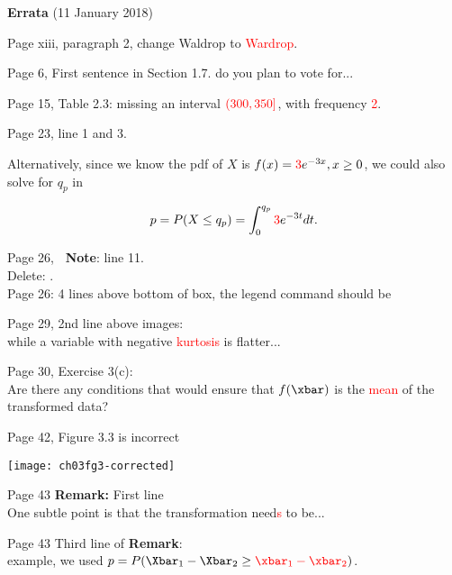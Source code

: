 \documentclass[11pt]{article}
\begin{document}
\medskip
{\bf \Large Errata} (11 January 2018)

\bigskip
Page xiii, paragraph 2, change Waldrop to \textcolor{red}{Wardrop}.

\bigskip
Page 6, First sentence in Section 1.7. {\color{red}{Whom}} do you plan to vote for...


\bigskip
Page 15, Table 2.3: missing an interval $\textcolor{red}{(300, 350]}$, with frequency
\textcolor{red}{2}.


\bigskip
Page 23, line 1 and 3.%

\smallskip
Alternatively, since we know the pdf of $X$ is $f(x)=\textcolor{red}{3}e^{-3x}, x\ge 0$, we
could also solve for $q_p$ in

\[
p = P(X \le q_p)=\int_0^{q_p}\textcolor{red}{3}e^{-3t}dt.
\]


\bigskip
Page 26, {\bf \R~Note}: line 11. \\
Delete: .\\

Page 26: 4 lines above bottom of box, the legend command should be \\

\bigskip
Page 29, 2nd line above images: \\
while a variable with negative \textcolor{red}{kurtosis} is flatter...

\bigskip
Page 30, Exercise 3(c):\\
 Are there any conditions that would ensure that
$f(\xbar)$ is the \textcolor{red}{mean} of the transformed data?

\bigskip
Page 42, Figure 3.3 is incorrect
\begin{center}
\texttt{[image: ch03fg3-corrected]}
\end{center}


\bigskip
Page 43 {\bf Remark:} First line\\
One subtle point is that the transformation need\textcolor{red}{s} to be...

Page 43 Third line of {\bf Remark}: \\
 example, we used $p=P(\Xbar_1-\Xbar_2 \ge \textcolor{red}{\xbar_1-\xbar_2})$.
\end{document}
